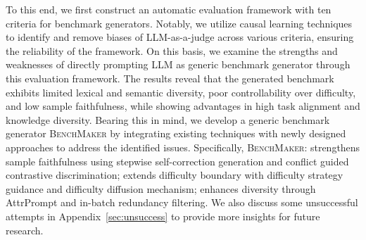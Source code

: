 To this end, we first construct an automatic evaluation framework with ten criteria for benchmark generators. Notably, we utilize causal learning \citep{caulearn} techniques to identify and remove biases of LLM-as-a-judge \citep{geval} across various criteria, ensuring the reliability of the framework. 
On this basis, we examine the strengths and weaknesses of directly prompting LLM as generic benchmark generator through this evaluation framework. The results reveal that the generated benchmark exhibits limited lexical and semantic diversity, poor controllability over difficulty, and low sample faithfulness, while showing advantages in high task alignment and knowledge diversity.
Bearing this in mind, we develop a generic benchmark generator \textsc{BenchMaker} by integrating existing techniques with newly designed approaches to address the identified issues.
Specifically, \textsc{BenchMaker}: strengthens sample faithfulness using stepwise self-correction generation and conflict guided contrastive discrimination; extends difficulty boundary with difficulty strategy guidance and difficulty diffusion mechanism; enhances diversity through AttrPrompt \citep{attr} and in-batch redundancy filtering. We also discuss some unsuccessful attempts in Appendix~\ref{sec:unsuccess} to provide more insights for future research.




